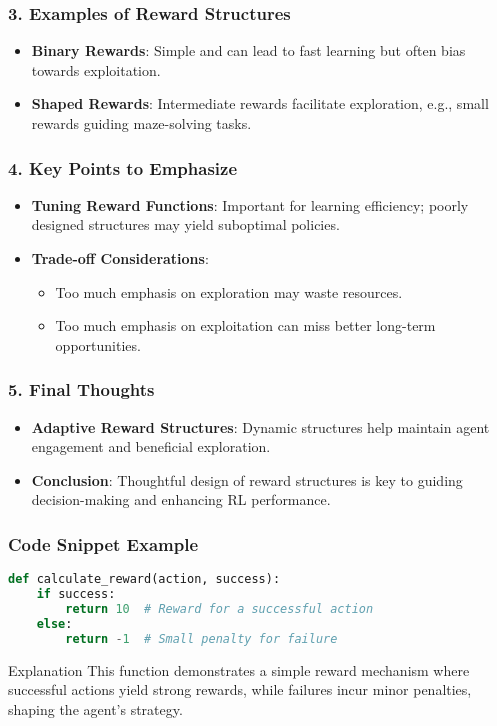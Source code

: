 \documentclass[aspectratio=169]{beamer}
\begin{document}
\begin{frame}[fragile]
  \frametitle{3. Examples of Reward Structures}
  \begin{itemize}
    \item \textbf{Binary Rewards}: Simple and can lead to fast learning but often bias towards exploitation.
    \item \textbf{Shaped Rewards}: Intermediate rewards facilitate exploration, e.g., small rewards guiding maze-solving tasks.
  \end{itemize}
\end{frame}

\begin{frame}[fragile]
  \frametitle{4. Key Points to Emphasize}
  \begin{itemize}
    \item \textbf{Tuning Reward Functions}: Important for learning efficiency; poorly designed structures may yield suboptimal policies.
    \item \textbf{Trade-off Considerations}:
      \begin{itemize}
        \item Too much emphasis on exploration may waste resources.
        \item Too much emphasis on exploitation can miss better long-term opportunities.
      \end{itemize}
  \end{itemize}
\end{frame}

\begin{frame}[fragile]
  \frametitle{5. Final Thoughts}
  \begin{itemize}
    \item \textbf{Adaptive Reward Structures}: Dynamic structures help maintain agent engagement and beneficial exploration.
    \item \textbf{Conclusion}: Thoughtful design of reward structures is key to guiding decision-making and enhancing RL performance.
  \end{itemize}
\end{frame}

\begin{frame}[fragile]
  \frametitle{Code Snippet Example}
  \begin{lstlisting}[language=Python]
def calculate_reward(action, success):
    if success:
        return 10  # Reward for a successful action
    else:
        return -1  # Small penalty for failure
  \end{lstlisting}
  \begin{block}{Explanation}
    This function demonstrates a simple reward mechanism where successful actions yield strong rewards, while failures incur minor penalties, shaping the agent's strategy.
  \end{block}
\end{frame}
\end{document}
